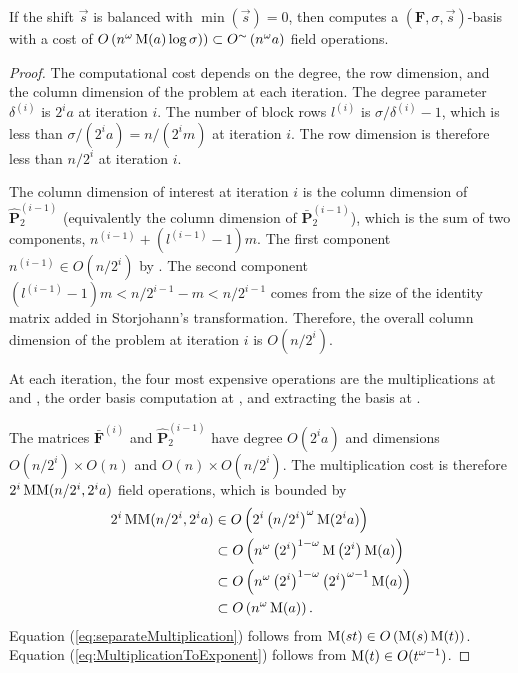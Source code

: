 \begin{thm}
\label{thm:balancedCost}If the shift $\vec{s}$ is balanced with
$\min\left(\vec{s}\right)=0$, then  computes
a $\left(\mathbf{F},\sigma,\vec{s}\right)$-basis with a cost of $O\left(n^{\omega}\M(a)\log\sigma)\right)\subset O^{\sim}\left(n^{\omega}a\right)$
 field operations. \end{thm}
\begin{proof}
The computational cost depends on the degree, the row dimension, and
the column dimension of the problem at each iteration. The degree
parameter $\delta^{\left(i\right)}$ is $2^{i}a$ at iteration $i$.
The number of block rows $l^{\left(i\right)}$ is $\sigma/\delta^{\left(i\right)}-1$,
which is less than $\sigma/(2^{i}a)=n/(2^{i}m)$ at iteration $i$.
The row dimension is therefore less than $n/2^{i}$ at iteration $i$.

The column dimension of interest at iteration $i$ is the column dimension
of $\hat{\mathbf{P}}_{2}^{\left(i-1\right)}$ (equivalently the column
dimension of $\bar{\mathbf{P}}_{2}^{\left(i-1\right)}$), which is
the sum of two components, $n^{\left(i-1\right)}+(l^{\left(i-1\right)}-1)m$.
The first component $n^{\left(i-1\right)}\in O(n/2^{i})$ by .
The second component $(l^{\left(i-1\right)}-1)m<n/2^{i-1}-m<n/2^{i-1}$
comes from the size of the identity matrix added in Storjohann's transformation.
Therefore, the overall column dimension of the problem at iteration
$i$ is $O(n/2^{i})$.

At each iteration, the four most expensive operations are the multiplications
at  and ,
the order basis computation at ,
and extracting the basis at .

The matrices $\bar{\mathbf{F}}^{\left(i\right)}$ and $\hat{\mathbf{P}}_{2}^{\left(i-1\right)}$
have degree $O(2^{i}a)$ and dimensions $O(n/2^{i})\times O\left(n\right)$
and $O\left(n\right)\times O(n/2^{i})$. The multiplication cost is
therefore $2^{i}\MM(n/2^{i},2^{i}a)$ field operations, which is bounded
by
\begin{align}
2^{i}\MM(n/2^{i},2^{i}a) & \in O\left(2^{i}\left(n/2^{i}\right)^{\omega}\M(2^{i}a)\right)\nonumber \\
 & \subset O\left(n^{\omega}\left(2^{i}\right)^{1-\omega}\M\left(2^{i}\right)\M(a)\right)\label{eq:separateMultiplication}\\
 & \subset O\left(n^{\omega}\left(2^{i}\right)^{1-\omega}\left(2^{i}\right)^{\omega-1}\M(a)\right)\label{eq:MultiplicationToExponent}\\
 & \subset O\left(n^{\omega}\M(a)\right).\nonumber 
\end{align}
Equation (\ref{eq:separateMultiplication}) follows from $\M(st)\in O\left(\M(s)\M(t)\right)$.
Equation (\ref{eq:MultiplicationToExponent}) follows from $\M(t)\in O(t^{\omega-1})$.


\end{proof}
